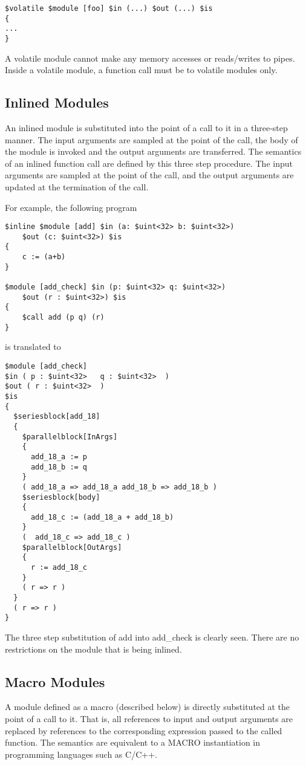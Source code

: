 \documentclass{article}
\begin{document}
\begin{verbatim}
$volatile $module [foo] $in (...) $out (...) $is
{
...
}
\end{verbatim}

A volatile module cannot make any memory accesses or 
reads/writes to pipes.  Inside a volatile module, 
a function call must be to volatile modules only.


\subsection{Inlined Modules}

An inlined module is substituted into the
point of a call to it in a three-step manner.
The input arguments are sampled at the point
of the call, the body of
the module is invoked and the output arguments
are transferred.  The semantics of an inlined
function call are defined by this three step
procedure.  The input arguments are sampled
at the point of the call, and the output
arguments are updated at the termination of
the call.

For example, the following
program 
\begin{verbatim}
$inline $module [add] $in (a: $uint<32> b: $uint<32>)
    $out (c: $uint<32>) $is
{
    c := (a+b)
}  

$module [add_check] $in (p: $uint<32> q: $uint<32>) 
    $out (r : $uint<32>) $is
{
    $call add (p q) (r)
}
\end{verbatim}
is translated to
\begin{verbatim}
$module [add_check]
$in ( p : $uint<32>   q : $uint<32>  )
$out ( r : $uint<32>  )
$is
{
  $seriesblock[add_18] 
  {
    $parallelblock[InArgs] 
    {
      add_18_a := p
      add_18_b := q
    }
    ( add_18_a => add_18_a add_18_b => add_18_b )
    $seriesblock[body] 
    {
      add_18_c := (add_18_a + add_18_b)
    }
    (  add_18_c => add_18_c )
    $parallelblock[OutArgs] 
    {
      r := add_18_c
    }
    ( r => r )
  }
  ( r => r )
}
\end{verbatim}
The three step substitution of add into add\_check
is clearly seen.  
There are no restrictions on the
module that is being inlined.


\subsection{Macro Modules}

A module defined as a macro (described below)
is directly substituted at the point of a call
to it.  That is, all references to input and
output arguments
are replaced by references to the corresponding
expression passed to the called function.  
The semantics are equivalent to a MACRO instantiation
in programming languages such as C/C++.
\end{document}
